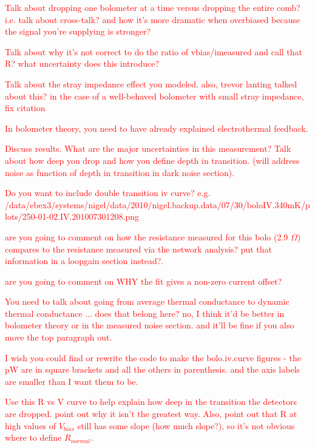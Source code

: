 \textcolor{red}{Talk about dropping one bolometer at a time versus dropping the entire comb? i.e. talk about cross-talk? and how it's more dramatic when overbiased because the signal you're supplying is stronger?}

\textcolor{red}{Talk about why it's not correct to do the ratio of vbias/imeasured and call that R? what uncertainty does this introduce?}

\textcolor{red}{Talk about the stray impedance effect you modeled. also, trevor lanting talked about this? in the case of a well-behaved bolometer with small stray impedance, \cite{lanting_thesis} \textcolor{red}{fix citation}}

\textcolor{red}{In bolometer theory, you need to have already explained electrothermal feedback.}

\textcolor{red}{Discuss results. What are the major uncertainties in this measurement? Talk about how deep you drop and how you define depth in transition. (will address noise as function of depth in transition in dark noise section).}

\textcolor{red}{Do you want to include double transition iv curve? e.g. /data/ebex3/systems/nigel/data/2010/nigel.backup.data/07/30/boloIV.340mK/plots/250-01-02.IV.201007301208.png}


\textcolor{red}{are you going to comment on how the resistance measured for this bolo (2.9 $\Omega$) compares to the resistance measured via the network analysis? put that information in a loopgain section instead?.}

\textcolor{red}{are you going to comment on WHY the fit gives a non-zero current offset?}

\textcolor{red}{You need to talk about going from average thermal conductance to dynamic thermal conductance ... does that belong here? no, I think it'd be better in bolometer theory or in the measured noise section. and it'll be fine if you also move the top paragraph out.}

 \textcolor{red}{I wish you could find or rewrite the code to make the bolo.iv.curve figures - the pW are in square brackets and all the others in parenthesis. and the axis labels are smaller than I want them to be.}


\textcolor{red}{Use this R vs V curve to help explain how deep in the transition the detectors are dropped. point out why it isn't the greatest way. Also, point out that R at high values of $V_{bias}$ still has some slope (how much slope?), so it's not obvious where to define $R_{normal}$. }


